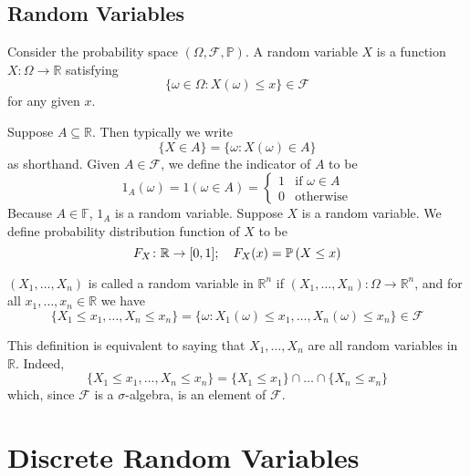 \documentclass{article}
\begin{document}
\subsection{Random Variables}
\begin{definition}
	Consider the probability space $(\Omega, \mathcal F, \mathbb P)$. A random variable $X$ is a function $X \colon \Omega \to \mathbb R$ satisfying
	\[ \{ \omega \in \Omega \colon X(\omega) \leq x \} \in \mathcal F \]
	for any given $x$.
\end{definition}
\noindent Suppose $A \subseteq \mathbb R$. Then typically we write
\[ \{ X \in A \} = \{ \omega \colon X(\omega) \in A \} \]
as shorthand. Given $A \in \mathcal F$, we define the indicator of $A$ to be
\[ 1_A(\omega) = 1(\omega \in A) = \begin{cases}
		1 & \text{if } \omega \in A \\
		0 & \text{otherwise}
	\end{cases} \]
Because $A \in \mathbb F$, $1_A$ is a random variable. Suppose $X$ is a random variable. We define probability distribution function of $X$ to be
\[ F_X \colon \mathbb R \to [0, 1];\quad F_X(x) = \mathbb{P}\left({X \leq x}\right) \]
\begin{definition}
	$(X_1, \dots, X_n)$ is called a random variable in $\mathbb R^n$ if $(X_1, \dots, X_n) \colon \Omega \to \mathbb R^n$, and for all $x_1, \dots, x_n \in \mathbb R$ we have
	\[ \{ X_1 \leq x_1, \dots, X_n \leq x_n \} = \{ \omega \colon X_1(\omega) \leq x_1, \dots, X_n(\omega) \leq x_n \} \in \mathcal F \]
\end{definition}
\noindent This definition is equivalent to saying that $X_1, \dots, X_n$ are all random variables in $\mathbb R$. Indeed,
\[ \{ X_1 \leq x_1, \dots, X_n \leq x_n \} = \{ X_1 \leq x_1 \} \cap \dots \cap \{ X_n \leq x_n \} \]
which, since $\mathcal F$ is a $\sigma$-algebra, is an element of $\mathcal F$.

\section{Discrete Random Variables}
\end{document}
